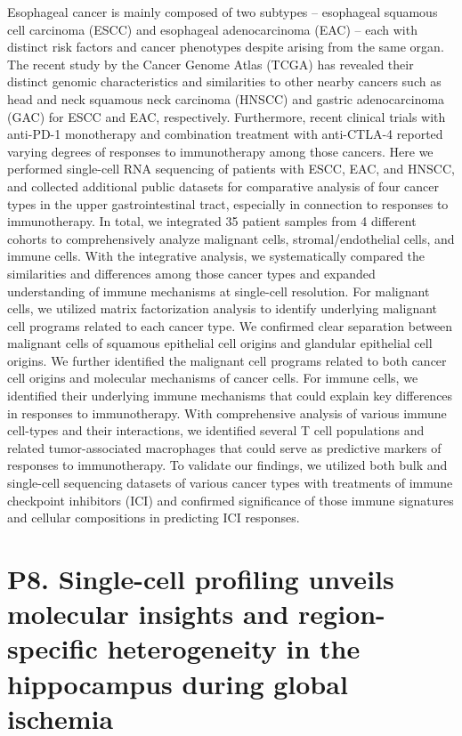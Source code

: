 \noindent
Esophageal cancer is mainly composed of two subtypes – esophageal squamous cell carcinoma (ESCC) and esophageal adenocarcinoma (EAC) – each with distinct risk factors and cancer phenotypes despite arising from the same organ. The recent study by the Cancer Genome Atlas (TCGA) has revealed their distinct genomic characteristics and similarities to other nearby cancers such as head and neck squamous neck carcinoma (HNSCC) and gastric adenocarcinoma (GAC) for ESCC and EAC, respectively. Furthermore, recent clinical trials with anti-PD-1 monotherapy and combination treatment with anti-CTLA-4 reported varying degrees of responses to immunotherapy among those cancers. Here we performed single-cell RNA sequencing of patients with ESCC, EAC, and HNSCC, and collected additional public datasets for comparative analysis of four cancer types in the upper gastrointestinal tract, especially in connection to responses to immunotherapy. In total, we integrated 35 patient samples from 4 different cohorts to comprehensively analyze malignant cells, stromal/endothelial cells, and immune cells. With the integrative analysis, we systematically compared the similarities and differences among those cancer types and expanded understanding of immune mechanisms at single-cell resolution. For malignant cells, we utilized matrix factorization analysis to identify underlying malignant cell programs related to each cancer type. We confirmed clear separation between malignant cells of squamous epithelial cell origins and glandular epithelial cell origins. We further identified the malignant cell programs related to both cancer cell origins and molecular mechanisms of cancer cells. For immune cells, we identified their underlying immune mechanisms that could explain key differences in responses to immunotherapy. With comprehensive analysis of various immune cell-types and their interactions, we identified several T cell populations and related tumor-associated macrophages that could serve as predictive markers of responses to immunotherapy. To validate our findings, we utilized both bulk and single-cell sequencing datasets of various cancer types with treatments of immune checkpoint inhibitors (ICI) and confirmed significance of those immune signatures and cellular compositions in predicting ICI responses.
\newpage

\section*{P8. Single-cell profiling unveils molecular insights and region-specific heterogeneity in the hippocampus during global ischemia}

